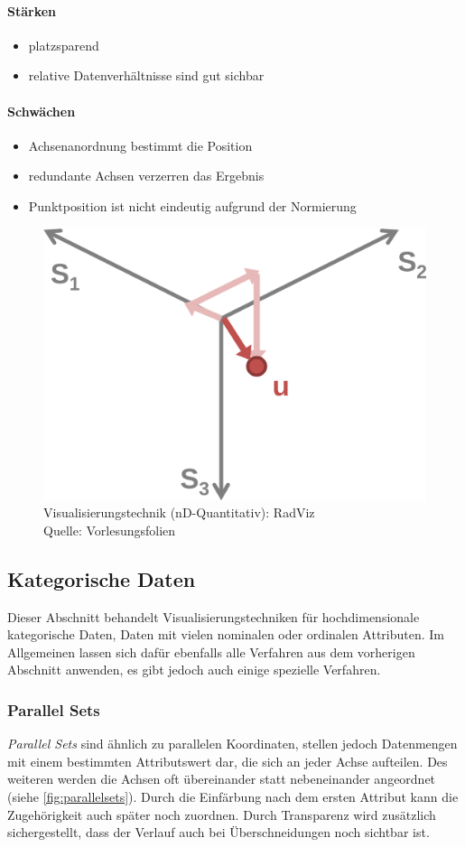 				\paragraph{Stärken}
				\begin{itemize}
					\item platzsparend
					\item relative Datenverhältnisse sind gut sichbar
				\end{itemize}

				\paragraph{Schwächen}
				\begin{itemize}
					\item Achsenanordnung bestimmt die Position
					\item redundante Achsen verzerren das Ergebnis
					\item Punktposition ist nicht eindeutig aufgrund der Normierung
				\end{itemize}

				\begin{figure}
					\centering
					\includegraphics[width=0.3\linewidth]{radviz}
					\caption[Visualisierungstechnik (nD-Quantitativ): RadViz]{Visualisierungstechnik (nD-Quantitativ): RadViz\\Quelle: Vorlesungsfolien}
					\label{fig:radviz}
				\end{figure}

		\subsection{Kategorische Daten}
			Dieser Abschnitt behandelt Visualisierungstechniken für hochdimensionale kategorische Daten, \dh Daten mit vielen nominalen oder ordinalen Attributen. Im Allgemeinen lassen sich dafür ebenfalls alle Verfahren aus dem vorherigen Abschnitt anwenden, es gibt jedoch auch einige spezielle Verfahren.

			\subsubsection{Parallel Sets}
				\emph{Parallel Sets} sind ähnlich zu parallelen Koordinaten, stellen jedoch Datenmengen mit einem bestimmten Attributswert dar, die sich an jeder Achse aufteilen. Des weiteren werden die Achsen oft übereinander statt nebeneinander angeordnet (siehe \autoref{fig:parallelsets}). Durch die Einfärbung nach dem ersten Attribut kann die Zugehörigkeit auch später noch zuordnen. Durch Transparenz wird zusätzlich sichergestellt, dass der Verlauf auch bei Überschneidungen noch sichtbar ist.

